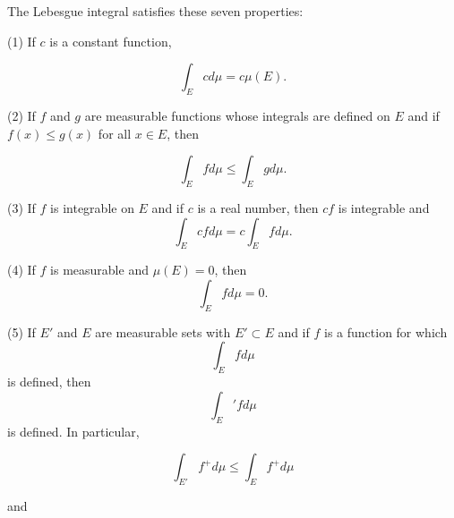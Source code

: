The Lebesgue integral satisfies these seven properties:

(1) If $c$ is a constant function,

$$\int_E cd\mu = c\mu(E).$$

(2) If $f$ and $g$ are measurable functions whose integrals are defined on $E$ and if $f(x) \leq g(x)$ for all $x \in E$, then

$$\int_E fd\mu \leq \int_E gd\mu.$$

(3) If $f$ is integrable on $E$ and if $c$ is a real number, then $cf$ is integrable and $$\int_E cfd\mu = c \int_E fd\mu.$$

(4) If $f$ is measurable and $\mu(E) = 0$, then $$\int_E fd\mu = 0.$$

(5) If $E'$ and $E$ are measurable sets with $E' \subset E$ and if $f$ is a function for which $$\int_E fd\mu$$ is defined, then $$\int_E' fd\mu$$ is defined. In particular,

$$\int_{E'} f^+ d\mu \leq \int_E f^+ d\mu$$

and
